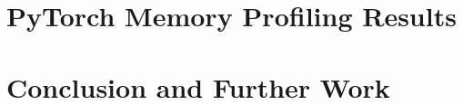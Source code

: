 \documentclass[12pt,letterpaper]{article}
\begin{document}
\section{PyTorch Memory Profiling Results}
\label{results}

\section{Conclusion and Further Work}
\label{conclusion}
\end{document}

